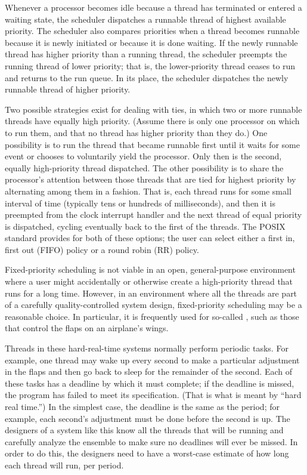Whenever a processor becomes idle because a thread has terminated or
entered a waiting state, the scheduler dispatches a runnable thread
of highest available priority.  The scheduler also compares priorities when a thread becomes runnable
because it is newly initiated or because it is done waiting.
If the newly runnable thread has higher priority than a running thread, the scheduler preempts the
running thread of lower priority; that is, the lower-priority thread
ceases to run and returns to the run queue.  In its
place, the scheduler dispatches the newly runnable thread of higher
priority.

Two possible strategies exist for dealing with ties, in which two or more
runnable threads have equally high priority.  (Assume there is only
one processor on which to run them, and that no thread has higher priority
than they do.)  One possibility is to run the thread
that became runnable first until it waits for some event or chooses
to voluntarily yield the processor.  Only then is the second, equally
high-priority thread dispatched. The other possibility is to share the
processor's attention between those threads that are tied for highest
priority by alternating among them in a  fashion.  That
is, each thread runs for some small interval of time (typically tens
or hundreds of milliseconds), and then it is preempted from the clock
interrupt handler and the next thread of equal priority is dispatched,
cycling eventually back to the first of the threads.  The POSIX
standard provides for both of these options; the user can select
either a first in, first out (FIFO) policy or a round robin (RR)
policy.

Fixed-priority scheduling is not viable in an open, general-purpose
environment where a user might accidentally or otherwise create a
high-priority thread that runs for a long time.  However, in an
environment where all the threads are part of a carefully
quality-controlled system design, fixed-priority scheduling may be a
reasonable choice.  In particular, it is frequently used for so-called
, such as those that control the flaps on
an airplane's wings.

Threads in these hard-real-time systems normally perform periodic
tasks.  For example, one thread may wake up every second to make a
particular adjustment in the flaps and then go back to sleep for the remainder of the
second.  Each of these tasks has a deadline by which it must complete;
if the deadline is missed, the program has failed to meet its
specification.  (That is what is meant by ``hard real time.'')  In the
simplest case, the deadline is the same as the period; for example, each
second's adjustment must be done before the second is up.  The
designers of a system like this know all the threads that will be
running and carefully analyze the ensemble to make sure no deadlines
will ever be missed.  In order to do this, the designers need to have
a worst-case estimate of how long each thread will run, per period.

